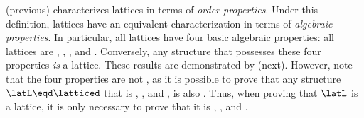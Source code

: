  (previous) characterizes lattices in terms of \emph{order properties}.
Under this definition, lattices have an equivalent characterization 
in terms of \emph{algebraic properties}.
In particular, all lattices have four basic algebraic properties:
all lattices are , , , and .
Conversely, any structure that possesses these four properties \emph{is} a lattice.
These results are demonstrated by  (next).
However, note that the four properties are not ,
as it is possible to prove that any structure $\latL\eqd\latticed$ that is
, , and ,
is also  .
Thus, when proving that $\latL$ is a lattice, it is only necessary to prove
that it is 
, , and .

